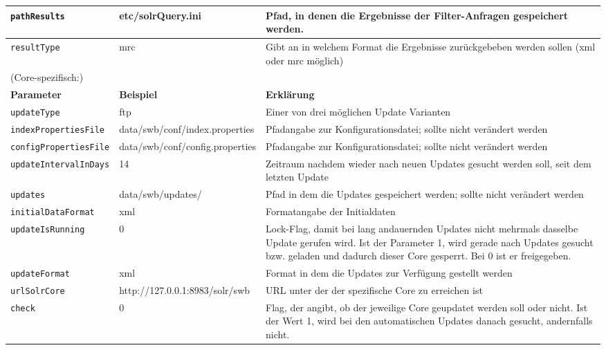 \documentclass[10pt]{article}
\begin{document}
\begin{center}
\begin{longtable}{| l | p{5cm} | p{5cm} | }
	\texttt{pathResults} & etc/solrQuery.ini & Pfad, in denen die Ergebnisse der Filter-Anfragen gespeichert werden. \\ \hline
	
	\texttt{resultType} & mrc & Gibt an in welchem Format die Ergebnisse zurückgebeben werden sollen (xml oder mrc möglich) \\ \hline
	
	
	\multicolumn{3}{l}{(Core-spezifisch:)} \\ \hline
	\textbf{Parameter} & \textbf{Beispiel} & \textbf{Erklärung} \\ \hline
	
	\texttt{updateType} & ftp & Einer von drei möglichen Update Varianten \\ \hline
	
	\texttt{indexPropertiesFile} & data/swb/conf/index.properties & Pfadangabe zur Konfigurationsdatei; sollte nicht verändert werden \\ \hline
	
	\texttt{configPropertiesFile} & data/swb/conf/config.properties & Pfadangabe zur Konfigurationsdatei; sollte nicht verändert werden \\ \hline
	
	\texttt{updateIntervalInDays} & 14 & Zeitraum nachdem wieder nach neuen Updates gesucht werden soll, seit dem letzten Update \\ \hline

	\texttt{updates} & data/swb/updates/ & Pfad in dem die Updates gespeichert werden; sollte nicht verändert werden \\ \hline
	
	\texttt{initialDataFormat} & xml & Formatangabe der Initialdaten \\ \hline
	
	\texttt{updateIsRunning} & 0 & Lock-Flag, damit bei lang andauernden Updates nicht mehrmals dasselbe Update gerufen wird. Ist der Parameter 1, wird gerade nach Updates gesucht bzw. geladen und dadurch dieser Core gesperrt. Bei 0 ist er freigegeben. \\ \hline
	
	\texttt{updateFormat} & xml & Format in dem die Updates zur Verfügung gestellt werden \\ \hline
	
	\texttt{urlSolrCore} & http://127.0.0.1:8983/solr/swb & URL unter der der spezifische Core zu erreichen ist \\ \hline
	
	\texttt{check} & 0 & Flag, der angibt, ob der jeweilige Core geupdatet werden soll oder nicht. Ist der Wert 1, wird bei den automatischen Updates danach gesucht, andernfalls nicht. \\ \hline
	

\end{longtable}
\end{center}
\end{document}
